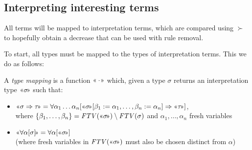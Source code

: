 \documentclass[runningheads,a4paper]{llncs}
\newcommand{\quant}[2]{\forall #1[#2]}
\newcommand{\typeinterpret}[1]{\text{\guillemotleft} #1\! \text{\guillemotright}}
\newcommand{\arrtype}{\Rightarrow}
\newcommand{\FTV}{\mathit{FTV}}
\begin{document}
\subsection{Interpreting interesting terms}

All terms will be mapped to interpretation terms, which are compared
using $\succ$ to hopefully obtain a decrease that can be used with
rule removal.

To start, all types must be mapped to the types of interpretation
terms.  This we do as follows:

\begin{definition}
A \emph{type mapping} is a function $\typeinterpret{\cdot}$ which,
given a type $\sigma$ returns an interpretation type $\typeinterpret{
\sigma}$ such that:
\begin{itemize}
\item $\typeinterpret{\sigma \arrtype \tau} =
  \quant{\alpha_1 \dots \alpha_n}{\typeinterpret{\sigma}[\beta_1:=
  \alpha_1,\dots,\beta_n:=\alpha_n] \arrtype
  \typeinterpret{\tau}}$, \\
  where $\{\beta_1,\dots,\beta_n\} = \FTV(\typeinterpret{\sigma})
  \setminus \FTV(\sigma)$ and $\alpha_1,\dots,\alpha_n$ fresh
  variables
\item $\typeinterpret{\quant{\alpha}{\sigma}} =
  \quant{\alpha}{\typeinterpret{\sigma}}$ \\
  (where fresh variables in $\FTV(\typeinterpret{\sigma})$ must also
  be chosen distinct from $\alpha$)
\end{itemize}


\end{definition}
\end{document}

